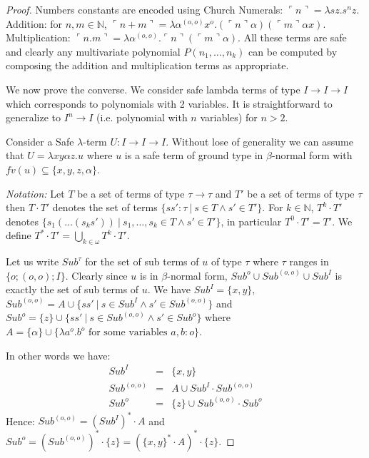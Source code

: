 \documentclass{article}
\newcommand{\encode}[1]{\ulcorner #1 \urcorner}
\newcommand{\nat}{\mathbb{N}}
\newcommand{\Union}{\bigcup}
\begin{document}
\begin{proof}
Numbers constants are encoded using Church Numerals: $\encode{n} = \lambda s z. s^n z$. 
Addition: for $n,m \in \nat$, $\encode{n+m} = \lambda \alpha^{(o,o)} x^o . (\encode{n} \alpha) (\encode{m} \alpha x)$. Multiplication: $\encode{n . m} = \lambda \alpha^{(o,o)} . \encode{n} (\encode{m} \alpha)$.
All these terms are safe and clearly any multivariate polynomial $P(n_1, \ldots, n_k)$ can be computed by composing the addition and multiplication terms as appropriate.

We now prove the converse. We consider safe lambda terms of type $I\rightarrow I  \rightarrow I$ which corresponds to polynomials with 2 variables. It is straightforward to generalize to $I^n \rightarrow I$ (i.e. polynomial with $n$ variables) for $n>2$.
 
Consider a Safe $\lambda$-term $U:I\rightarrow I\rightarrow I$. Without lose of generality we can assume that $U = \lambda x y \alpha z. u$ where $u$ is a safe term of ground type in $\beta$-normal form with $fv(u) \subseteq \{ x, y, z, \alpha \}$.

\emph{Notation:} Let $T$ be a set of terms of type $\tau \rightarrow \tau$ and $T'$ be a set of terms of type $\tau$ then $T \cdot T'$ denotes the set of terms $\{ s s' : \tau \ | \ s \in T \wedge s' \in T' \}$. For $k\in\nat$, $T^k \cdot T'$ denotes  $\{ s_1( \ldots (s_k s'))  \ | \ s_1, \ldots, s_k \in T \wedge s' \in T' \}$, in particular $T^0 \cdot T' = T'$. We   define $T^*\cdot T' = \Union_{k \in \omega} T^k \cdot T'$.

Let us write $Sub^\tau$ for the set of sub terms of $u$ of type $\tau$ where $\tau$ ranges in $\{ o; (o,o); I  \}$. Clearly since $u$ is in $\beta$-normal form, $Sub^o \cup Sub^{(o,o)} \cup Sub^I$ is exactly the set of sub terms of $u$.
We have $Sub^I = \{ x, y\}$, $Sub^{(o,o)} = A \cup \{ s s' \ | \ s \in Sub^I \wedge s' \in Sub^{(o,o)} \}$ and
$Sub^o = \{ z \} \cup \{ s s' \ | \ s \in Sub^{(o,o)} \wedge s' \in Sub^o \}$ where $A = \{ \alpha \} \cup \{ \lambda a^o . b^o \mbox{ for some variables } a,b:o \}$. 

In other words we have:
\begin{eqnarray*}
Sub^I &=& \{ x, y\} \\
Sub^{(o,o)} &=&  A \cup Sub^I \cdot Sub^{(o,o)} \\
Sub^o &=& \{ z \} \cup Sub^{(o,o)} \cdot Sub^o
\end{eqnarray*}
Hence: $Sub^{(o,o)} = (Sub^I)^* \cdot A$ and $Sub^o = (Sub^{(o,o)})^* \cdot \{ z \} = (\{ x, y\}^* \cdot A)^* \cdot \{ z \}$.


\end{proof}
\end{document}
